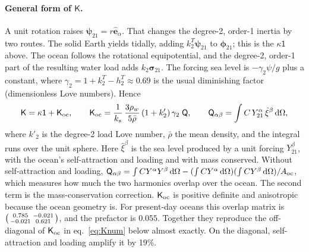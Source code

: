 \documentclass[11pt,a4paper]{article}
\newcommand{\be}{\hat{\mathbf{e}}}
\newcommand{\Id}{\mathsf{1}}
\newcommand{\K}{\mathsf{K}}
\newcommand{\dd}{\,\mathrm{d}}
\begin{document}
\paragraph{General form of $\K$.} A unit rotation raises $\bm\psi_{21}=r\be_\alpha$. That changes
the degree-2, order-1 inertia by two routes. The solid Earth yields tidally, adding $k^T_2\bm\psi_{21}$
to $\bm\phi_{21}$; this is the $\kappa\Id$ above. The ocean follows the rotational equipotential, and the
degree-2, order-1 part of the resulting water load adds $k_2\bm\sigma_{21}$. The forcing sea level is
$-\gamma_2\psi/g$ plus a constant, where $\gamma_2=1+k^T_2-h^T_2\approx0.69$ is the usual diminishing
factor (dimensionless Love numbers). Hence
\begin{equation}
  \K=\kappa\Id+\K_{\rm oc},\qquad
  \K_{\rm oc}=\frac{1}{k_s}\,\frac{3\rho_w}{5\bar\rho}\,(1+k'_2)\,\gamma_2\;\mathsf{Q},\qquad
  \mathsf{Q}_{\alpha\beta}=\int C\,Y^\alpha_{21}\,\hat\xi^\beta\dd\Omega ,
  \label{eq:Kform}
\end{equation}
where $k'_2$ is the degree-2 load Love number, $\bar\rho$ the mean density, and the integral runs over
the unit sphere. Here $\hat\xi^\beta$ is the sea level produced by a unit forcing $Y^\beta_{21}$, with
the ocean's self-attraction and loading and with mass conserved. Without self-attraction and loading,
$\mathsf{Q}_{\alpha\beta}=\int CY^\alpha Y^\beta\dd\Omega-(\int CY^\alpha\dd\Omega)(\int CY^\beta\dd\Omega)/A_{\rm oc}$,
which measures how much the two harmonics overlap over the ocean. The second term is the
mass-conservation correction. $\K_{\rm oc}$ is positive definite and anisotropic because the ocean
geometry is. For present-day oceans this overlap matrix is
$\begin{psmallmatrix}0.785&-0.021\\-0.021&0.621\end{psmallmatrix}$, and the prefactor is $0.055$.
Together they reproduce the off-diagonal of $\K_{\rm oc}$ in eq.~\eqref{eq:Knum} below almost
exactly. On the diagonal, self-attraction and loading amplify it by 19\%.
\end{document}
